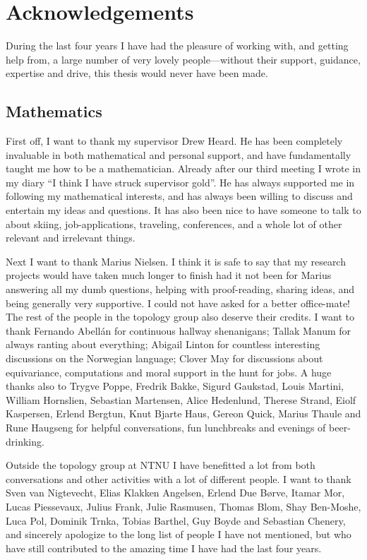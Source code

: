 
\section*{Acknowledgements}

During the last four years I have had the pleasure of working with, and getting help from, a large number of very lovely people---without their support, guidance, expertise and drive, this thesis would never have been made. 

\subsection*{Mathematics}

First off, I want to thank my supervisor Drew Heard. He has been completely invaluable in both mathematical and personal support, and have fundamentally taught me how to be a mathematician. Already after our third meeting I wrote in my diary ``I think I have struck supervisor gold''. He has always supported me in following my mathematical interests, and has always been willing to discuss and entertain my ideas and questions. It has also been nice to have someone to talk to about skiing, job-applications, traveling, conferences, and a whole lot of other relevant and irrelevant things. 

Next I want to thank Marius Nielsen. I think it is safe to say that my research projects would have taken much longer to finish had it not been for Marius answering all my dumb questions, helping with proof-reading, sharing ideas, and being generally very supportive. I could not have asked for a better office-mate! The rest of the people in the topology group also deserve their credits. I want to thank Fernando Abellán for continuous hallway shenanigans; Tallak Manum for always ranting about everything; Abigail Linton for countless interesting discussions on the Norwegian language; Clover May for discussions about equivariance, computations and moral support in the hunt for jobs. A huge thanks also to Trygve Poppe, Fredrik Bakke, Sigurd Gaukstad, Louis Martini, William Hornslien, Sebastian Martensen, Alice Hedenlund, Therese Strand, Eiolf Kaspersen, Erlend Bergtun, Knut Bjarte Haus, Gereon Quick, Marius Thaule and Rune Haugseng for helpful conversations, fun lunchbreaks and evenings of beer-drinking.

Outside the topology group at NTNU I have benefitted a lot from both conversations and other activities with a lot of different people. I want to thank Sven van Nigtevecht, Elias Klakken Angelsen, Erlend Due Børve, Itamar Mor, Lucas Piessevaux, Julius Frank, Julie Rasmusen, Thomas Blom, Shay Ben-Moshe, Luca Pol, Dominik Trnka, Tobias Barthel, Guy Boyde and Sebastian Chenery, and sincerely apologize to the long list of people I have not mentioned, but who have still contributed to the amazing time I have had the last four years. 

